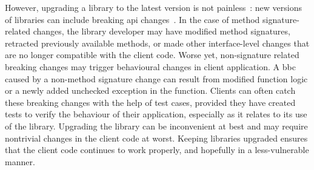 

However, upgrading a library to the latest version is not painless~\cite{elizalde18:_towar_smoot_librar_migrat,derr17:_keep,dann23:_upcy}:
new versions of libraries can include breaking \gls{api} changes~\cite{dietrich14:_broken}. In the case
of method signature-related changes, the library developer may have modified method signatures,
retracted previously available methods, or made other interface-level changes that are no longer
compatible with the client code. Worse yet, non-signature related breaking changes may trigger behavioural
changes in client application.
A \gls{bbc} caused by a non-method signature change can result from modified function logic or
a newly added unchecked exception in the function.
Clients can often catch these breaking changes with the help of test cases, provided they have created
tests to verify the behaviour of their application, especially as it relates to its
use of the library.
Upgrading the library can be inconvenient at best and may require nontrivial changes in the client
code at worst. Keeping libraries upgraded ensures that the client code
continues to work properly, and hopefully in a less-vulnerable manner.

